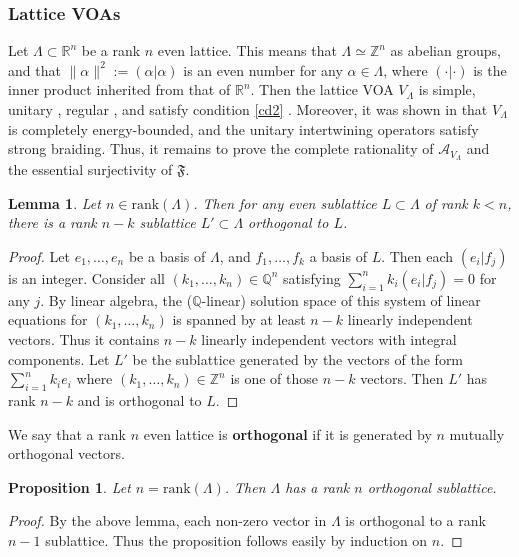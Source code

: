 \documentclass[12pt,a4paper]{article}
\theoremstyle{definition}
\theoremstyle{plain}
\newtheorem{pp}[df]{Proposition}
\newtheorem{lm}[df]{Lemma}
\newcommand{\fk}{\mathfrak}
\newcommand{\mc}{\mathcal}
\newcommand{\mbb}{\mathbb}
\newcommand{\rank}{\mathrm{rank}}
\numberwithin{equation}{subsection}
\begin{document}
\subsubsection*{Lattice VOAs}

Let $\Lambda\subset \mbb R^n$ be a rank $n$ even lattice. This means that $\Lambda\simeq\mbb Z^n$ as abelian groups, and that $\lVert\alpha\lVert^2:=(\alpha|\alpha)$ is an even number for any $\alpha\in\Lambda$, where  $(\cdot|\cdot)$ is the inner product inherited from that of $\mbb R^n$. Then the lattice VOA $V_\Lambda$ is simple, unitary \cite{DL14}, regular \cite{DLM97}, and satisfy condition \ref{cd2} \cite{Gui21a}. Moreover, it was shown in \cite{Gui21a} that $V_\Lambda$ is completely energy-bounded, and the unitary intertwining operators satisfy strong braiding. Thus, it remains to prove the complete rationality of $\mc A_{V_\Lambda}$ and the essential surjectivity of $\fk F$.

\begin{lm}\label{lb97}
Let $n\in\rank(\Lambda)$. Then for any even sublattice $L\subset\Lambda$ of rank $k<n$, there is a rank $n-k$ sublattice $L'\subset\Lambda$ orthogonal to $L$.
\end{lm}

\begin{proof}
Let $e_1,\dots,e_n$ be a basis of $\Lambda$, and $f_1,\dots,f_k$ a basis of $L$. Then each  $(e_i|f_j)$ is an integer. Consider all $(k_1,\dots,k_n)\in\mbb Q^n$ satisfying $\sum_{i=1}^nk_i(e_i|f_j)=0$ for any $j$. By linear algebra, the ($\mbb Q$-linear) solution space of this system of linear equations for $(k_1,\dots,k_n)$ is spanned by at least $n-k$ linearly independent vectors. Thus it contains $n-k$ linearly independent vectors with integral components. Let $L'$ be the sublattice generated by the vectors of the form $\sum_{i=1}^nk_ie_i$ where $(k_1,\dots,k_n)\in\mbb Z^n$ is one of those $n-k$  vectors. Then $L'$ has rank $n-k$ and is orthogonal to $L$. 
\end{proof}

We say that a rank $n$ even lattice is \textbf{orthogonal} if it is generated by $n$ mutually orthogonal vectors.

\begin{pp}\label{lb98}
Let $n=\rank(\Lambda)$. Then $\Lambda$ has a rank $n$ orthogonal sublattice.
\end{pp}

\begin{proof}
By the above lemma, each non-zero vector in $\Lambda$ is orthogonal to a rank $n-1$ sublattice. Thus the proposition follows easily by induction on $n$.
\end{proof}
\end{document}
